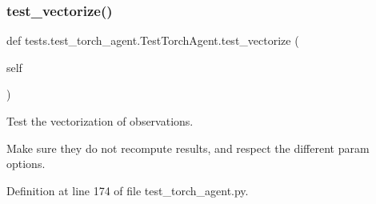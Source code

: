 \mbox{\label{classtests_1_1test__torch__agent_1_1TestTorchAgent_a551847086a9d8bf6bc04ea1efeacf608}} 
\subsubsection{\texorpdfstring{test\+\_\+vectorize()}{test\_vectorize()}}
{\footnotesize\ttfamily def tests.\+test\+\_\+torch\+\_\+agent.\+Test\+Torch\+Agent.\+test\+\_\+vectorize (\begin{DoxyParamCaption}\item[{}]{self }\end{DoxyParamCaption})}

\begin{DoxyVerb}Test the vectorization of observations.

Make sure they do not recompute results, and respect the different param
options.
\end{DoxyVerb}
 

Definition at line 174 of file test\+\_\+torch\+\_\+agent.\+py.


